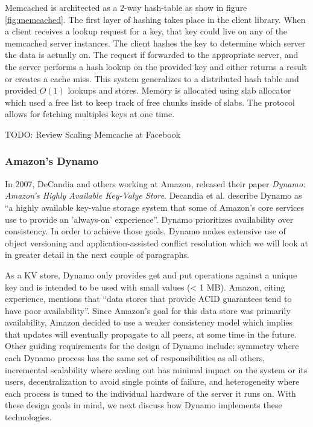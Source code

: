 \documentclass[]{article}
\begin{document}
Memcached is architected as a 2-way hash-table as show in figure \ref{fig:memcached}. The first layer of hashing takes place in the client library. When a client receives a lookup request for a key, that key could live on any of the memcached server instances. The client hashes the key to determine which server the data is actually on. The request if forwarded to the appropriate server, and the server performs a hash lookup on the provided key and either returns a result or creates a cache miss. This system generalizes to a distributed hash table and provided $O(1)$ lookups and stores. Memory is allocated using slab allocator which used a free list to keep track of free chunks inside of slabs. The protocol allows for fetching multiples keys at one time. 

TODO: Review Scaling Memcache at Facebook

\subsubsection{Amazon's Dynamo}
In 2007, DeCandia and others working at Amazon, released their paper \textit{Dynamo: Amazon's Highly Available Key-Valye Store}\cite{decandia_dynamo:_2007}. Decandia et al. describe Dynamo as ``a highly available key-value storage system that some of Amazon's core services use to provide an 'always-on' experience''. Dynamo prioritizes availability over consistency. In order to achieve those goals, Dynamo makes extensive use of object versioning and application-assisted conflict resolution which we will look at in greater detail in the next couple of paragraphs.

As a KV store, Dynamo only provides get and put operations against a unique key and is intended to be used with small values (< 1 MB). Amazon, citing experience, mentions that ``data stores that provide ACID guarantees tend to have poor availability''. Since Amazon's goal for this data store was primarily availability, Amazon decided to use a weaker consistency model which implies that updates will eventually propagate to all peers, at some time in the future. Other guiding requirements for the design of Dynamo include: symmetry where each Dynamo process has the same set of responsibilities as all others, incremental scalability where scaling out has minimal impact on the system or its users, decentralization to avoid single points of failure, and heterogeneity where each process is tuned to the individual hardware of the server it runs on. With these design goals in mind, we next discuss how Dynamo implements these technologies.
\end{document}
